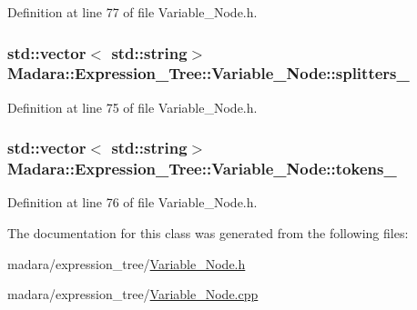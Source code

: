 Definition at line 77 of file Variable\_\-Node.h.

\hypertarget{classMadara_1_1Expression__Tree_1_1Variable__Node_a80651fa347cb92ec7803228f4ee78f16}{
\subsubsection[{splitters\_\-}]{\setlength{\rightskip}{0pt plus 5cm}std::vector$<$ std::string$>$ {\bf Madara::Expression\_\-Tree::Variable\_\-Node::splitters\_\-}}}
\label{df/d66/classMadara_1_1Expression__Tree_1_1Variable__Node_a80651fa347cb92ec7803228f4ee78f16}


Definition at line 75 of file Variable\_\-Node.h.

\hypertarget{classMadara_1_1Expression__Tree_1_1Variable__Node_afb71d8424471fa78309c7a1306bff684}{
\subsubsection[{tokens\_\-}]{\setlength{\rightskip}{0pt plus 5cm}std::vector$<$ std::string$>$ {\bf Madara::Expression\_\-Tree::Variable\_\-Node::tokens\_\-}}}
\label{df/d66/classMadara_1_1Expression__Tree_1_1Variable__Node_afb71d8424471fa78309c7a1306bff684}


Definition at line 76 of file Variable\_\-Node.h.



The documentation for this class was generated from the following files:\begin{DoxyCompactItemize}
\item 
madara/expression\_\-tree/\hyperlink{Variable__Node_8h}{Variable\_\-Node.h}\item 
madara/expression\_\-tree/\hyperlink{Variable__Node_8cpp}{Variable\_\-Node.cpp}\end{DoxyCompactItemize}
